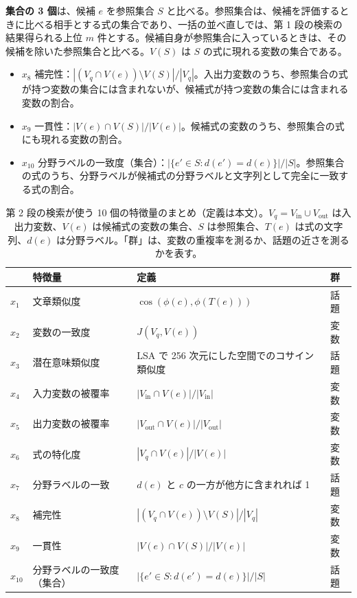 \documentclass[11pt,a4paper]{ltjsarticle}
\newcommand{\Vin}{V_{\mathrm{in}}}
\newcommand{\Vout}{V_{\mathrm{out}}}
\begin{document}
\textbf{集合の 3 個}は、候補 $e$ を参照集合 $S$ と比べる。参照集合は、候補を評価するときに比べる相手とする式の集合であり、一括の並べ直しでは、第 1 段の検索の結果得られる上位 $m$ 件とする。候補自身が参照集合に入っているときは、その候補を除いた参照集合と比べる。$V(S)$ は $S$ の式に現れる変数の集合である。
\begin{itemize}[leftmargin=1.5em]
  \item $x_8$ 補完性：$|(V_q \cap V(e)) \setminus V(S)| / |V_q|$。入出力変数のうち、参照集合の式が持つ変数の集合には含まれないが、候補式が持つ変数の集合には含まれる変数の割合。
  \item $x_9$ 一貫性：$|V(e) \cap V(S)| / |V(e)|$。候補式の変数のうち、参照集合の式にも現れる変数の割合。
  \item $x_{10}$ 分野ラベルの一致度（集合）：$|\{e' \in S : d(e') = d(e)\}| / |S|$。参照集合の式のうち、分野ラベルが候補式の分野ラベルと文字列として完全に一致する式の割合。
\end{itemize}

\begin{table}[t]\centering
\footnotesize
\caption{第 2 段の検索が使う 10 個の特徴量のまとめ（定義は本文）。$V_q = \Vin \cup \Vout$ は入出力変数、$V(e)$ は候補式の変数の集合、$S$ は参照集合、$T(e)$ は式の文字列、$d(e)$ は分野ラベル。「群」は、変数の重複率を測るか、話題の近さを測るかを表す。}
\label{tab:features}
\begin{tabular}{@{}llll@{}}
\toprule
 & 特徴量 & 定義 & 群 \\
\midrule
$x_1$ & 文章類似度 & $\cos(\phi(c), \phi(T(e)))$ & 話題 \\
$x_2$ & 変数の一致度 & $J(V_q, V(e))$ & 変数 \\
$x_3$ & 潜在意味類似度 & LSA で 256 次元にした空間でのコサイン類似度 & 話題 \\
$x_4$ & 入力変数の被覆率 & $|\Vin \cap V(e)| / |\Vin|$ & 変数 \\
$x_5$ & 出力変数の被覆率 & $|\Vout \cap V(e)| / |\Vout|$ & 変数 \\
$x_6$ & 式の特化度 & $|V_q \cap V(e)| / |V(e)|$ & 変数 \\
$x_7$ & 分野ラベルの一致 & $d(e)$ と $c$ の一方が他方に含まれれば 1 & 話題 \\
\midrule
$x_8$ & 補完性 & $|(V_q \cap V(e)) \setminus V(S)| / |V_q|$ & 変数 \\
$x_9$ & 一貫性 & $|V(e) \cap V(S)| / |V(e)|$ & 変数 \\
$x_{10}$ & 分野ラベルの一致度（集合） & $|\{e' \in S : d(e') = d(e)\}| / |S|$ & 話題 \\
\bottomrule
\end{tabular}
\end{table}
\end{document}
